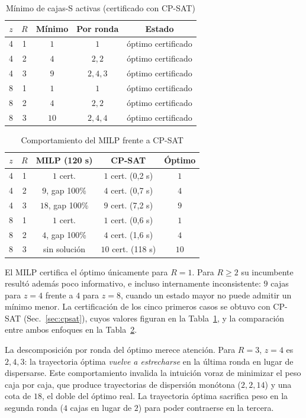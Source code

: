 \documentclass[conference]{IEEEtran}
\begin{document}
\begin{table}[t]
\caption{Mínimo de cajas-S activas (certificado con CP-SAT)}
\label{tab:res}
\centering
\begin{tabular}{@{}ccccc@{}}
\toprule
$z$ & $R$ & Mínimo & Por ronda & Estado \\
\midrule
4 & 1 & $1$        & $1$     & óptimo certificado \\
4 & 2 & $4$        & $2,2$   & óptimo certificado \\
4 & 3 & $9$        & $2,4,3$ & óptimo certificado \\
8 & 1 & $1$        & $1$     & óptimo certificado \\
8 & 2 & $4$        & $2,2$   & óptimo certificado \\
8 & 3 & $10$       & $2,4,4$ & óptimo certificado \\
\bottomrule
\end{tabular}
\end{table}

\begin{table}[t]
\caption{Comportamiento del MILP frente a CP-SAT}
\label{tab:comp}
\centering
\begin{tabular}{@{}ccccc@{}}
\toprule
$z$ & $R$ & MILP (120 s) & CP-SAT & Óptimo \\
\midrule
4 & 1 & $1$ cert.      & $1$ cert. (0,2 s)   & $1$ \\
4 & 2 & $9$, gap 100\% & $4$ cert. (0,7 s)   & $4$ \\
4 & 3 & $18$, gap 100\% & $9$ cert. (7,2 s)  & $9$ \\
8 & 1 & $1$ cert.      & $1$ cert. (0,6 s)   & $1$ \\
8 & 2 & $4$, gap 100\% & $4$ cert. (1,6 s)   & $4$ \\
8 & 3 & sin solución   & $10$ cert. (118 s)  & $10$ \\
\bottomrule
\end{tabular}
\end{table}

El MILP certifica el óptimo únicamente para $R=1$. Para $R\ge2$ su incumbente resultó
además poco informativo, e incluso internamente inconsistente: $9$ cajas para $z=4$ frente
a $4$ para $z=8$, cuando un estado mayor no puede admitir un mínimo menor. La
certificación de los cinco primeros casos se obtuvo con CP-SAT
(Sec.~\ref{sec:cpsat}), cuyos valores figuran en la Tabla~\ref{tab:res}, y la comparación
entre ambos enfoques en la Tabla~\ref{tab:comp}.

La descomposición por ronda del óptimo merece atención. Para $R=3$, $z=4$ es $2,4,3$: la
trayectoria óptima \emph{vuelve a estrecharse} en la última ronda en lugar de dispersarse.
Este comportamiento invalida la intuición voraz de minimizar el peso caja por caja, que
produce trayectorias de dispersión monótona ($2,2,14$) y una cota de $18$, el doble del
óptimo real. La trayectoria óptima sacrifica peso en la segunda ronda ($4$ cajas en lugar
de $2$) para poder contraerse en la tercera.
\end{document}
